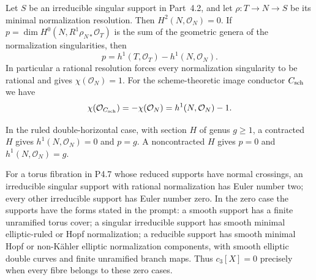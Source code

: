 \begin{proposition}[P4.33]\hypertarget{tag-02X6}{}\label{night:P4.33}\label{stmt:P4.33}


Let $S$ be an irreducible singular support in Part~4.2, and let
$\rho:T\to N\to S$ be its minimal normalization resolution.
Then $H^2(N,\mathcal O_N)=0$. If
$p=\dim H^0(N,R^1\rho_{N*}\mathcal O_T)$ is the sum of the
geometric genera of the normalization singularities, then
\[
 p=h^1(T,\mathcal O_T)-h^1(N,\mathcal O_N).
\]
In particular a rational resolution forces every normalization
singularity to be rational and gives $\chi(\mathcal O_N)=1$.
For the scheme-theoretic image conductor $C_{\rm sch}$ we have
\[
 \chi(\mathcal O_{C_{\rm sch}})
   =-\chi(\mathcal O_N)=h^1(N,\mathcal O_N)-1.
\]

In the ruled double-horizontal case, with section $H$ of genus
$g\ge1$, a contracted $H$ gives $h^1(N,\mathcal O_N)=0$ and
$p=g$. A noncontracted $H$ gives $p=0$ and
$h^1(N,\mathcal O_N)=g$.
\end{proposition}

\begin{proposition}[P4.8]\hypertarget{tag-02Y0}{}\label{night:P4.8}\label{stmt:P4.8}


For a torus fibration in P4.7 whose reduced supports have normal
crossings, an irreducible singular support with
rational normalization has Euler number two; every other irreducible
support has Euler number zero. In the zero case the supports have the
forms stated in the prompt: a smooth support has a finite unramified
torus cover; a singular irreducible support has smooth minimal
elliptic-ruled or Hopf normalization; a reducible support has smooth
minimal Hopf or non-Kähler elliptic normalization components, with
smooth elliptic double curves and finite unramified branch maps.
Thus $c_3[X]=0$ precisely when every fibre belongs to these zero cases.
\end{proposition}


